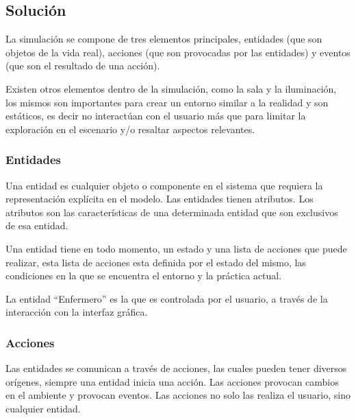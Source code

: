 

\subsection{Solución}

La simulación se compone de tres elementos principales, entidades (que son
objetos de la vida real), acciones (que son provocadas por las entidades) y
eventos (que son el resultado de una acción). 

Existen otros elementos dentro de la simulación, como la sala y la iluminación,
los mismos son importantes para crear un entorno similar a la realidad y son
estáticos, es decir no interactúan con el usuario más que para limitar la
exploración en el escenario y/o resaltar aspectos relevantes.

\subsubsection{Entidades}

Una entidad es cualquier objeto o componente en el sistema que requiera la representación
explícita en el modelo\cite{banks2000dm}. Las entidades tienen atributos. Los
atributos son las características de una determinada entidad que son exclusivos
de esa entidad.

Una entidad tiene en todo momento, un estado y una lista de acciones que
puede realizar, esta lista de acciones esta definida por el estado del mismo,
las condiciones en la que se encuentra el entorno y la práctica actual.

La entidad \enquote{Enfermero} es la que es controlada por el usuario, a través
de la interacción con la interfaz gráfica.

\subsubsection{Acciones}

Las entidades se comunican a través de acciones, las cuales pueden tener
diversos orígenes, siempre una entidad inicia una acción. Las acciones provocan
cambios en el ambiente y provocan eventos. Las acciones no solo las
realiza el usuario, sino cualquier entidad.

